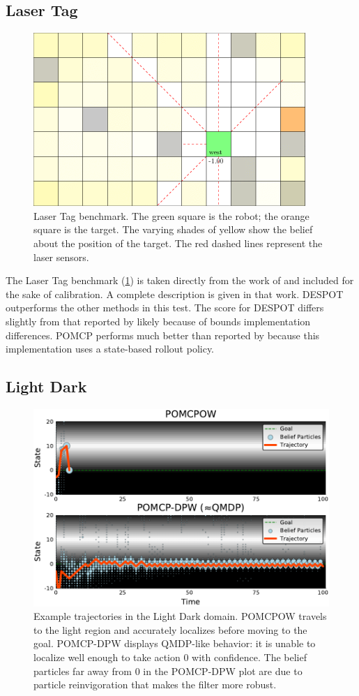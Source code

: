 \subsection{Laser Tag}

\begin{figure}[htpb]
    \centering
    \includegraphics[width=0.6\linewidth]{media/lasertag.png}
    \caption[Laser Tag benchmark]{Laser Tag benchmark. The green square is the robot; the orange square is the target. The varying shades of yellow show the belief about the position of the target. The red dashed lines represent the laser sensors.}
    \label{fig:lasertag}
\end{figure}

The Laser Tag benchmark (\cref{fig:lasertag}) is taken directly from the work of \citet{somani2013despot} and included for the sake of calibration. A complete description is given in that work. DESPOT outperforms the other methods in this test. The score for DESPOT differs slightly from that reported by \citet{somani2013despot} likely because of bounds implementation differences.
POMCP performs much better than reported by \citet{somani2013despot} because this implementation uses a state-based rollout policy.

\subsection{Light Dark}

\begin{figure}[htb]
    \centering
    \includegraphics[width=0.6\columnwidth]{media/ld_fig.pdf}
    \caption[Light Dark problem]{Example trajectories in the Light Dark domain. POMCPOW travels to the light region and accurately localizes before moving to the goal. POMCP-DPW displays QMDP-like behavior: it is unable to localize well enough to take action \num{0} with confidence. The belief particles far away from \num{0} in the POMCP-DPW plot are due to particle reinvigoration that makes the filter more robust.}
    \label{fig:ld}
\end{figure}

